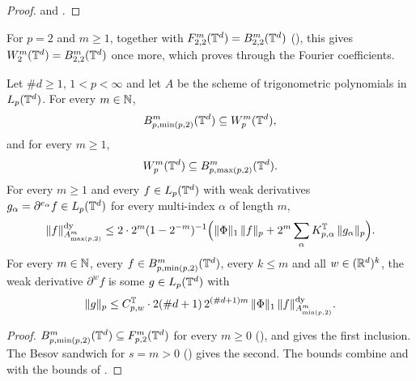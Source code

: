 \begin{proof}
\leanok
{} and .
\end{proof}

For $p = 2$ and $m \geq 1$, together with $F^{m}_{2,2}(\mathbb{T}^d) = B^{m}_{2,2}(\mathbb{T}^d)$
(), this gives $W^{m}_{2}(\mathbb{T}^d) = B^{m}_{2,2}(\mathbb{T}^d)$ once
more, which  proves through the Fourier coefficients.

\begin{corollary}
\label{cor:torus-sobolev-besov-sandwich}
\leanok
{}
Let $\#d \geq 1$, $1 < p < \infty$ and let $A$ be the scheme of trigonometric polynomials in
$L_p(\mathbb{T}^d)$. For every $m \in \mathbb{N}$,
\[
  B^{m}_{p,\min(p,2)}(\mathbb{T}^d) \subseteq W^{m}_{p}(\mathbb{T}^d) ,
\]
and for every $m \geq 1$,
\[
  W^{m}_{p}(\mathbb{T}^d) \subseteq B^{m}_{p,\max(p,2)}(\mathbb{T}^d) .
\]
For every $m \geq 1$ and every $f \in L_p(\mathbb{T}^d)$ with weak derivatives
$g_\alpha = \partial^{e_\alpha} f \in L_p(\mathbb{T}^d)$ for every multi-index $\alpha$ of length $m$,
\[
  \|f\|^{\mathrm{dy}}_{A^m_{\max(p,2)}} \leq 2 \cdot 2^m (1 - 2^{-m})^{-1}
  \Bigl( \|\Phi\|_1 \, \|f\|_p + 2^m \sum_\alpha K^{\mathbb{T}}_{p,\alpha} \, \|g_\alpha\|_p \Bigr) .
\]
For every $m \in \mathbb{N}$, every $f \in B^{m}_{p,\min(p,2)}(\mathbb{T}^d)$, every $k \leq m$ and all
$w \in (\mathbb{R}^d)^k$, the weak derivative $\partial^w f$ is some $g \in L_p(\mathbb{T}^d)$ with
\[
  \|g\|_p \leq C^{\mathbb{T}}_{p,w} \cdot 2 (\#d + 1) \, 2^{(\#d + 1) m} \, \|\Phi\|_1 \,
  \|f\|^{\mathrm{dy}}_{A^m_{\min(p,2)}} .
\]
\end{corollary}

\begin{proof}
\leanok
$B^{m}_{p,\min(p,2)}(\mathbb{T}^d) \subseteq F^{m}_{p,2}(\mathbb{T}^d)$ for every $m \geq 0$
(), and  gives
the first inclusion. The Besov sandwich for $s = m > 0$ ()
gives the second. The bounds combine  and
 with the bounds of
.
\end{proof}

